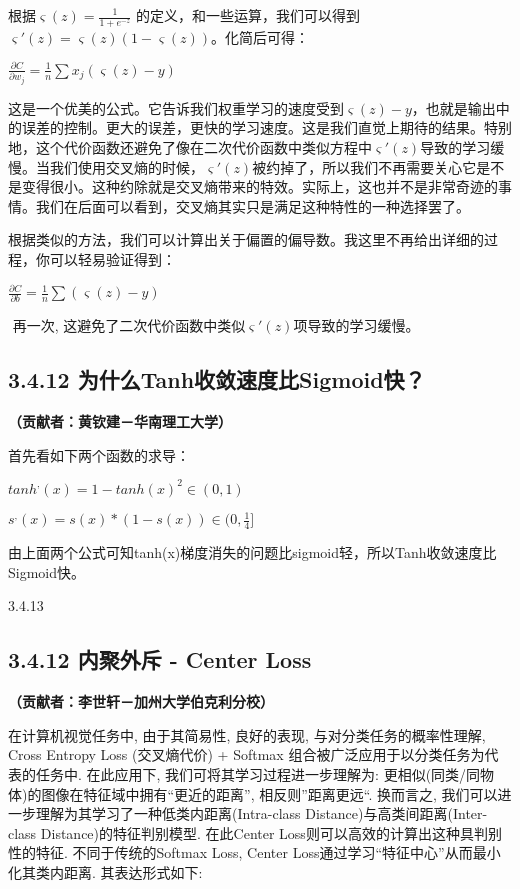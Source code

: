 ​ 根据\(\varsigma(z)=\frac{1}{1+e^{-z}}\)
的定义，和⼀些运算，我们可以得到
\({\varsigma}'(z)=\varsigma(z)(1-\varsigma(z))\)。化简后可得：

\(\frac{\partial C}{\partial w_{j}}=\frac{1}{n}\sum x_{j}({\varsigma}(z)-y)\)

​
这是⼀个优美的公式。它告诉我们权重学习的速度受到\(\varsigma(z)-y\)，也就是输出中的误差的控制。更⼤的误差，更快的学习速度。这是我们直觉上期待的结果。特别地，这个代价函数还避免了像在⼆次代价函数中类似⽅程中\({\varsigma}'(z)\)导致的学习缓慢。当我们使⽤交叉熵的时候，\({\varsigma}'(z)\)被约掉了，所以我们不再需要关⼼它是不是变得很⼩。这种约除就是交叉熵带来的特效。实际上，这也并不是⾮常奇迹的事情。我们在后⾯可以看到，交叉熵其实只是满⾜这种特性的⼀种选择罢了。

​
根据类似的⽅法，我们可以计算出关于偏置的偏导数。我这⾥不再给出详细的过程，你可以轻易验证得到：

\(\frac{\partial C}{\partial b}=\frac{1}{n}\sum ({\varsigma}(z)-y)\)

​ 再⼀次,
这避免了⼆次代价函数中类似\({\varsigma}'(z)\)项导致的学习缓慢。

\subsection{3.4.12
为什么Tanh收敛速度比Sigmoid快？}\label{ux4e3aux4ec0ux4e48tanhux6536ux655bux901fux5ea6ux6bd4sigmoidux5feb}

\textbf{（贡献者：黄钦建－华南理工大学）}

首先看如下两个函数的求导：

\(tanh^{,}(x)=1-tanh(x)^{2}\in (0,1)\)

\(s^{,}(x)=s(x)*(1-s(x))\in (0,\frac{1}{4}]\)

由上面两个公式可知tanh(x)梯度消失的问题比sigmoid轻，所以Tanh收敛速度比Sigmoid快。

3.4.13

\subsection{3.4.12 内聚外斥 - Center
Loss}\label{ux5185ux805aux5916ux65a5---center-loss}

\textbf{（贡献者：李世轩－加州大学伯克利分校）}

在计算机视觉任务中, 由于其简易性, 良好的表现, 与对分类任务的概率性理解,
Cross Entropy Loss (交叉熵代价) + Softmax
组合被广泛应用于以分类任务为代表的任务中. 在此应用下,
我们可将其学习过程进一步理解为:
更相似(同类/同物体)的图像在特征域中拥有``更近的距离'',
相反则''距离更远``. 换而言之,
我们可以进一步理解为其学习了一种低类内距离(Intra-class
Distance)与高类间距离(Inter-class Distance)的特征判别模型. 在此Center
Loss则可以高效的计算出这种具判别性的特征. 不同于传统的Softmax Loss,
Center Loss通过学习``特征中心''从而最小化其类内距离. 其表达形式如下:

